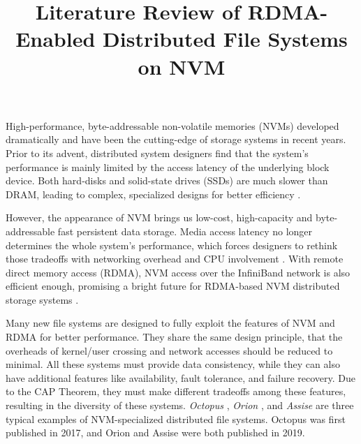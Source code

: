 
\begin{survey}
\label{cha:survey}

\title{Literature Review of RDMA-Enabled Distributed File Systems on NVM}
\maketitle

High-performance, byte-addressable non-volatile memories (NVMs) developed dramatically and have been the cutting-edge of storage systems in recent years. Prior to its advent, distributed system designers find that the system’s performance is mainly limited by the access latency of the underlying block device. Both hard-disks and solid-state drives (SSDs) are much slower than DRAM, leading to complex, specialized designs for better efficiency \cite{orion2019}.

However, the appearance of NVM brings us low-cost, high-capacity and byte-addressable fast persistent data storage. Media access latency no longer determines the whole system’s performance, which forces designers to rethink those tradeoffs with networking overhead and CPU involvement \cite{orion2019}. With remote direct memory access (RDMA), NVM access over the InfiniBand network is also efficient enough, promising a bright future for RDMA-based NVM distributed storage systems \cite{assise2019}.

Many new file systems are designed to fully exploit the features of NVM and RDMA for better performance. They share the same design principle, that the overheads of kernel/user crossing and network accesses should be reduced to minimal. All these systems must provide data consistency, while they can also have additional features like availability, fault tolerance, and failure recovery. Due to the CAP Theorem, they must make different tradeoffs among these features, resulting in the diversity of these systems. {\em Octopus} \cite{octopus2017}, {\em Orion} \cite{orion2019}, and {\em Assise} \cite{assise2019} are three typical examples of NVM-specialized distributed file systems. Octopus was first published in 2017, and Orion and Assise were both published in 2019.


\end{survey}
